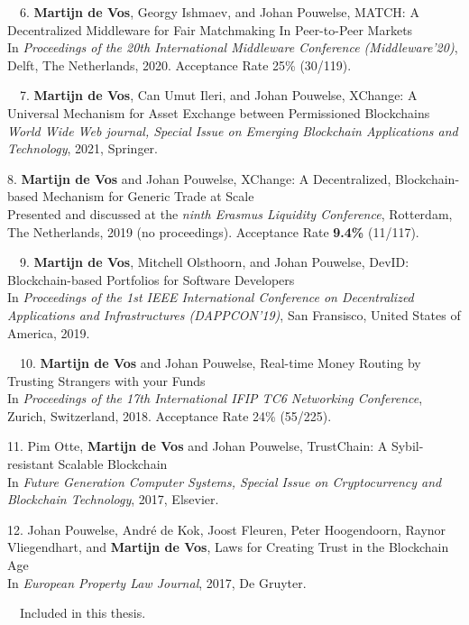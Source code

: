\begin{etaremune}
{\item[\faFileTextO~~6.] \textbf{Martijn de Vos}, Georgy Ishmaev, and Johan Pouwelse, MATCH: A Decentralized Middleware for Fair Matchmaking In
Peer-to-Peer Markets\\
In \emph{Proceedings of the 20th International Middleware Conference (Middleware'20)}, Delft, The Netherlands, 2020. Acceptance Rate 25\% (30/119).

\item[\faFileTextO~~7.] \textbf{Martijn de Vos}, Can Umut Ileri, and Johan Pouwelse, XChange: A Universal Mechanism for Asset Exchange between Permissioned Blockchains\\
\emph{World Wide Web journal, Special Issue on Emerging Blockchain Applications and Technology}, 2021, Springer.

\item[8.] \textbf{Martijn de Vos} and Johan Pouwelse, XChange: A Decentralized, Blockchain-based Mechanism for Generic Trade at Scale\\
Presented and discussed at the \emph{ninth Erasmus Liquidity Conference}, Rotterdam, The Netherlands, 2019 (no proceedings). Acceptance Rate \textbf{9.4\%} (11/117).

\item[\faFileTextO~~9.] \textbf{Martijn de Vos}, Mitchell Olsthoorn, and Johan Pouwelse, DevID: Blockchain-based Portfolios for Software Developers\\
In \emph{Proceedings of the 1st IEEE International Conference on Decentralized Applications and Infrastructures (DAPPCON'19)}, San Fransisco, United States of America, 2019.

\item[\faFileTextO~~10.] \textbf{Martijn de Vos} and Johan Pouwelse, Real-time Money Routing by Trusting Strangers with your Funds\\
In \emph{Proceedings of the 17th International IFIP TC6 Networking Conference}, Zurich, Switzerland, 2018. Acceptance Rate 24\% (55/225).

\item[11.] Pim Otte, \textbf{Martijn de Vos} and Johan Pouwelse, TrustChain: A Sybil-resistant Scalable Blockchain\\
In \emph{Future Generation Computer Systems, Special Issue on Cryptocurrency and Blockchain Technology}, 2017, Elsevier.

\item[12.] Johan Pouwelse, André de Kok, Joost Fleuren, Peter Hoogendoorn, Raynor Vliegendhart, and \textbf{Martijn de Vos}, Laws for Creating Trust in the Blockchain Age\\
In \emph{European Property Law Journal}, 2017, De Gruyter.

}\end{etaremune}

\vspace{0.5cm}
\noindent
\faFileTextO~~Included in this thesis.\\
